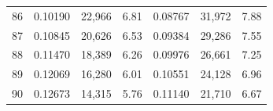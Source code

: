 \begin{tabular}{cccc|ccc}
86   & 0.10190                                                          & 22,966                                                                                            & 6.81                                                                                                                       & 0.08767                                                          & 31,972                                                                                            & 7.88                                                                                                                       \\
87   & 0.10845                                                          & 20,626                                                                                            & 6.53                                                                                                                       & 0.09384                                                          & 29,286                                                                                            & 7.55                                                                                                                       \\
88   & 0.11470                                                          & 18,389                                                                                            & 6.26                                                                                                                       & 0.09976                                                          & 26,661                                                                                            & 7.25                                                                                                                       \\
89   & 0.12069                                                          & 16,280                                                                                            & 6.01                                                                                                                       & 0.10551                                                          & 24,128                                                                                            & 6.96                                                                                                                       \\
90   & 0.12673                                                          & 14,315                                                                                            & 5.76                                                                                                                       & 0.11140                                                          & 21,710                                                                                            & 6.67                                                                                                                       \\

\end{tabular}

